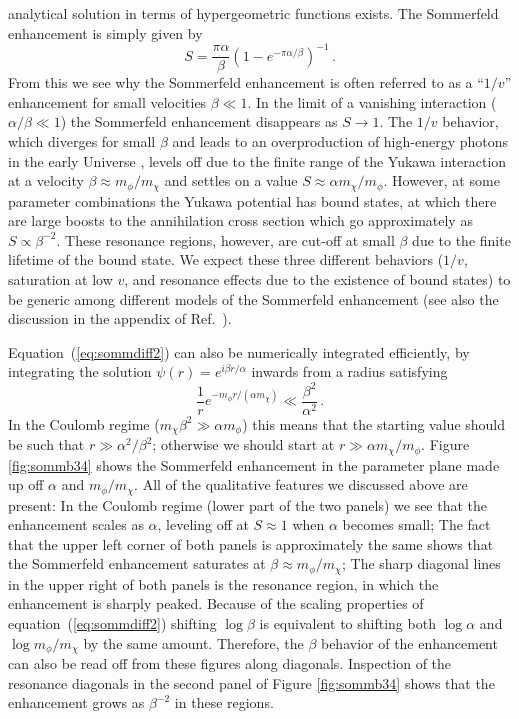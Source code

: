 \documentclass[aps,prd,twocolumn,amsmath,amssymb,floatfix,nofootinbib,10pt]{revtex4}
\newcommand{\somm}{\ensuremath{S}}
\newcommand{\mdm}{\ensuremath{m_{\chi}}}
\newcommand{\mv}{\ensuremath{m_{\phi}}}
\newcommand{\Eqnname}{Equation}
\newcommand{\eqnname}{equation}
\begin{document}
analytical solution in terms of hypergeometric functions exists. The
Sommerfeld enhancement is simply given by
\begin{equation}
\somm = \frac{\pi \alpha}{\beta} (1 - e^{-\pi\alpha/\beta})^{-1}\, .
\end{equation}
From this we see why the Sommerfeld enhancement is often referred to
as a ``$1/v$'' enhancement for small velocities $\beta \ll 1$. In the
limit of a vanishing interaction ($\alpha/\beta \ll 1$) the Sommerfeld
enhancement disappears as $\somm \rightarrow 1$. The $1/v$ behavior,
which diverges for small $\beta$ and leads to an overproduction of
high-energy photons in the early Universe \cite{2008arXiv0810.3233K},
levels off due to the finite range of the Yukawa interaction at a
velocity $\beta \approx \mv/\mdm$ and settles on a value $\somm \approx
\alpha \mdm/\mv$. However, at some parameter combinations the Yukawa
potential has bound states, at which there are large boosts to the
annihilation cross section which go approximately as $\somm \propto
\beta^{-2}$. These resonance regions, however, are cut-off at small
$\beta$ due to the finite lifetime of the bound state. We expect these
three different behaviors ($1/v$, saturation at low $v$, and resonance
effects due to the existence of bound states) to be generic among
different models of the Sommerfeld enhancement (see also the
discussion in the appendix of Ref.~\cite{ArkaniHamed:2008qn}).

\Eqnname\ (\ref{eq:sommdiff2}) can also be numerically integrated
efficiently, by integrating the solution $\psi(r) = e^{i\beta
r/\alpha}$ inwards from a radius satisfying
\begin{equation}
\frac{1}{r}e^{-\mv r/(\alpha \mdm)} \ll \frac{\beta^2}{\alpha^2} \, .
\end{equation}
In the Coulomb regime ($\mdm \beta^2 \gg \alpha \mv$) this means that
the starting value should be such that $r \gg \alpha^2/\beta^2$;
otherwise we should start at $r \gg \alpha \mdm/\mv$. Figure
\ref{fig:sommb34} shows the Sommerfeld enhancement in the parameter plane
made up off $\alpha$ and $\mv/\mdm$. All of the qualitative features
we discussed above are present: In the Coulomb regime (lower part of
the two panels) we see that the enhancement scales as $\alpha$,
leveling off at $\somm \approx 1$ when $\alpha$ becomes small; The
fact that the upper left corner of both panels is approximately the
same shows that the Sommerfeld enhancement saturates at $\beta \approx
\mv/\mdm$; The sharp diagonal lines in the upper right of both panels
is the resonance region, in which the enhancement is sharply
peaked. Because of the scaling properties of \eqnname\
(\ref{eq:sommdiff2}) shifting $\log\beta$ is equivalent to shifting
both $\log\alpha$ and $\log \mv/\mdm$ by the same amount. Therefore,
the $\beta$ behavior of the enhancement can also be read off from
these figures along diagonals. Inspection of the resonance diagonals
in the second panel of Figure \ref{fig:sommb34} shows that the enhancement
grows as $\beta^{-2}$ in these regions.
\end{document}
